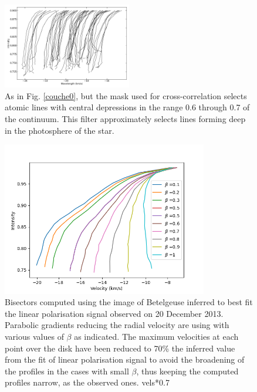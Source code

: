 \documentclass{/Users/art2/TeX/aanda/aa}
\def\kms {km\,s$^{-1}$}
\begin{document}
   \begin{figure}
      \includegraphics[width=0.5\textwidth]{bissecteurcouche06_07.png}
      \caption{As in Fig. \ref{couche0}, but the mask used for cross-correlation selects atomic lines with central depressions in the range 0.6 through 
      0.7 of the continuum. This filter approximately selects lines forming deep in the photosphere of the star.}
      \label{couche6}
      \end{figure}
   

\begin{figure}
   \includegraphics[width=0.8\textwidth]{Fig9_art74.png}

   \caption{Bisectors computed using the image of Betelgeuse inferred to best fit the linear polarisation signal observed on 20 December 2013. Parabolic 
   gradients reducing the radial velocity are using with various values of $\beta$ as indicated. The maximum velocities at each point over the disk
   have been reduced to 70\%  the inferred value from the fit of linear polarisation signal to avoid the broadening of the profiles in the cases with 
   small $\beta$, thus keeping the computed profiles narrow, as the observed ones. 
    vels*0.7}
   \label{bisector1}
   \end{figure}
\end{document}

